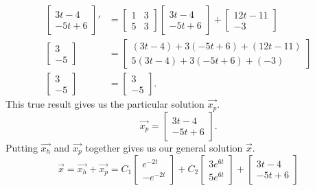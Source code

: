 \begin{align*}
	\begin{bmatrix}
		3t-4 \\
		-5t+6
	\end{bmatrix}' &= \begin{bmatrix}
		1 & 3 \\
		5 & 3
	\end{bmatrix} \begin{bmatrix}
		3t - 4 \\
		-5t + 6
	\end{bmatrix} + \begin{bmatrix}
		12t - 11 \\
		-3
	\end{bmatrix} \\
	\begin{bmatrix}
		3 \\
		-5
	\end{bmatrix} &= \begin{bmatrix}
		(3t-4) + 3(-5t+6) + (12t-11) \\
		5(3t-4) + 3(-5t+6) + (-3)
	\end{bmatrix} \\
	\begin{bmatrix}
		3 \\
		-5
	\end{bmatrix} &= \begin{bmatrix}
		3 \\
		-5
	\end{bmatrix}.
\end{align*}
This true result gives us the particular solution $\vec{x_p}$.
\begin{equation*}
	\vec{x_p} = \begin{bmatrix}
		3t - 4 \\
		-5t + 6
	\end{bmatrix}.
\end{equation*}
Putting $\vec{x_h}$ and $\vec{x_p}$ together gives us our general solution $\vec{x}$.
\begin{equation*}
	\vec{x} = \vec{x_h} + \vec{x_p} = C_1\begin{bmatrix}
		e^{-2t} \\
		-e^{-2t}
	\end{bmatrix} + C_2\begin{bmatrix}
		3e^{6t} \\
		5e^{6t}
	\end{bmatrix} + \begin{bmatrix}
		3t - 4 \\
		-5t + 6
	\end{bmatrix}
\end{equation*}